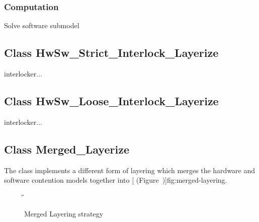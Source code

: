 \subsubsection{Computation}
\begin{description}

\label{sec:hwsw-loose-solveSoftware}
\item[solveSoftware] \texonly{---} Solve software submodel \\

\end{description}

\htmlrule
\subsection{Class HwSw_Strict_Interlock_Layerize}
\label{sec:hwsw-strict-interlock}

interlocker...

\htmlrule
\subsection{Class HwSw_Loose_Interlock_Layerize}
\label{sec:hwsw-loose-interlock}

interlocker...

\htmlrule
\subsection{Class Merged_Layerize}
\label{sec:merged}

The class  implements a different form of
layering which merges the hardware and software contention models
together into [ (Figure~\Ref)]{fig:merged-layering}.

\begin{figure}[htp]
  \label{fig:merged-layering}
  \begin{center}
    \T \tex \leavevmode 
    \caption{Merged Layering strategy}
    \H {}
  \end{center}
\end{figure}

